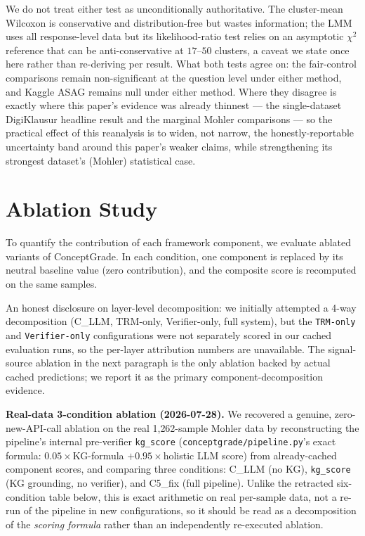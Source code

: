 \documentclass[conference]{IEEEtran}
\begin{document}
We do not treat either test as unconditionally authoritative. The
cluster-mean Wilcoxon is conservative and distribution-free but wastes
information; the LMM uses all response-level data but its likelihood-ratio
test relies on an asymptotic $\chi^2$ reference that can be anti-conservative
at $17$--$50$ clusters, a caveat we state once here rather than re-deriving
per result. What both tests agree on: the fair-control comparisons remain
non-significant at the question level under either method, and Kaggle ASAG
remains null under either method. Where they disagree is exactly where this
paper's evidence was already thinnest --- the single-dataset DigiKlausur
headline result and the marginal Mohler comparisons --- so the practical
effect of this reanalysis is to widen, not narrow, the honestly-reportable
uncertainty band around this paper's weaker claims, while strengthening its
strongest dataset's (Mohler) statistical case.

\section{Ablation Study}
\label{sec:ablation}

To quantify the contribution of each framework component, we evaluate ablated variants of ConceptGrade. In each condition, one component is replaced by its neutral baseline value (zero contribution), and the composite score is recomputed on the same samples.

An honest disclosure on layer-level decomposition: we initially attempted
a 4-way decomposition (C\_LLM, TRM-only, Verifier-only, full system),
but the \texttt{TRM-only} and \texttt{Verifier-only} configurations were
not separately scored in our cached evaluation runs, so the per-layer
attribution numbers are unavailable. The signal-source ablation in the
next paragraph is the only ablation backed by actual cached predictions;
we report it as the primary component-decomposition evidence.

\textbf{Real-data 3-condition ablation (2026-07-28).} We recovered a
genuine, zero-new-API-call ablation on the real 1{,}262-sample Mohler
data by reconstructing the pipeline's internal pre-verifier
\texttt{kg\_score} (\texttt{conceptgrade/pipeline.py}'s exact formula: $0.05\times$KG-formula
$+ 0.95\times$holistic LLM score) from already-cached component scores,
and comparing three conditions: C\_LLM (no KG), \texttt{kg\_score} (KG
grounding, no verifier), and C5\_fix (full pipeline). Unlike the
retracted six-condition table below, this is exact arithmetic on real
per-sample data, not a re-run of the pipeline in new configurations, so
it should be read as a decomposition of the \emph{scoring formula}
rather than an independently re-executed ablation.
\end{document}
